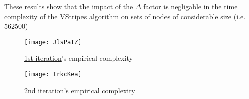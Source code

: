 These results show that the impact of the $\Delta$ factor is negligable in the time complexity of the VStripes algorithm on sets of nodes of considerable size (i.e. 562500)

\begin{figure}[H]
    \centering
    \texttt{[image: JlsPaIZ]}
    \caption{\hyperref[iterations]{1st iteration}'s empirical complexity}
\end{figure}

\begin{figure}[H]
    \centering
    \texttt{[image: IrkcKea]}
    \caption{\hyperref[iterations]{2nd iteration}'s empirical complexity}
\end{figure}


